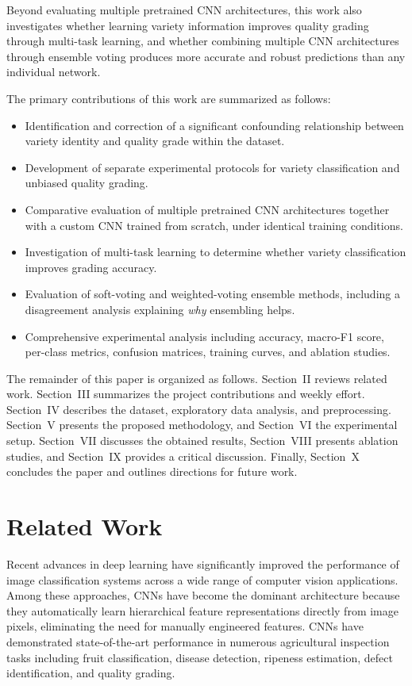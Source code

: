 \documentclass[conference]{IEEEtran}
\begin{document}
Beyond evaluating multiple pretrained CNN architectures, this work also investigates whether learning variety information improves quality grading through multi-task learning, and whether combining multiple CNN architectures through ensemble voting produces more accurate and robust predictions than any individual network.

The primary contributions of this work are summarized as follows:
\begin{itemize}
\item Identification and correction of a significant confounding relationship between variety identity and quality grade within the dataset.
\item Development of separate experimental protocols for variety classification and unbiased quality grading.
\item Comparative evaluation of multiple pretrained CNN architectures together with a custom CNN trained from scratch, under identical training conditions.
\item Investigation of multi-task learning to determine whether variety classification improves grading accuracy.
\item Evaluation of soft-voting and weighted-voting ensemble methods, including a disagreement analysis explaining \emph{why} ensembling helps.
\item Comprehensive experimental analysis including accuracy, macro-F1 score, per-class metrics, confusion matrices, training curves, and ablation studies.
\end{itemize}

The remainder of this paper is organized as follows. Section~II reviews related work. Section~III summarizes the project contributions and weekly effort. Section~IV describes the dataset, exploratory data analysis, and preprocessing. Section~V presents the proposed methodology, and Section~VI the experimental setup. Section~VII discusses the obtained results, Section~VIII presents ablation studies, and Section~IX provides a critical discussion. Finally, Section~X concludes the paper and outlines directions for future work.

\section{Related Work}
Recent advances in deep learning have significantly improved the performance of image classification systems across a wide range of computer vision applications. Among these approaches, CNNs have become the dominant architecture because they automatically learn hierarchical feature representations directly from image pixels, eliminating the need for manually engineered features. CNNs have demonstrated state-of-the-art performance in numerous agricultural inspection tasks including fruit classification, disease detection, ripeness estimation, defect identification, and quality grading.
\end{document}
